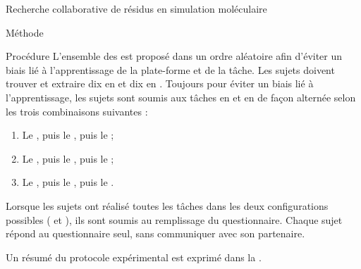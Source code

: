 \documentclass[myfrancais]{mythesis}
\begin{document}
\begin{mychapter}{Recherche collaborative de résidus en simulation moléculaire}
\begin{mysection}{Méthode}
\begin{mysubsection}{Procédure}
				L'ensemble des  est proposé dans un ordre aléatoire afin d'éviter un biais lié à l'apprentissage de la plate-forme et de la tâche.
				Les sujets doivent trouver et extraire dix  en  et dix  en .
				Toujours pour éviter un biais lié à l'apprentissage, les sujets sont soumis aux tâches en  et en  de façon alternée selon les trois combinaisons suivantes :
				\begin{enumerate}
					\item Le  , puis le  , puis le  ;
					\item Le  , puis le  , puis le  ;
					\item Le  , puis le  , puis le  .
				\end{enumerate}

				Lorsque les sujets ont réalisé toutes les tâches dans les deux configurations possibles ( et ), ils sont soumis au remplissage du questionnaire.
				Chaque sujet répond au questionnaire seul, sans communiquer avec son partenaire.

				Un résumé du protocole expérimental est exprimé dans la .


\end{mysubsection}
\end{mysection}
\end{mychapter}
\end{document}
